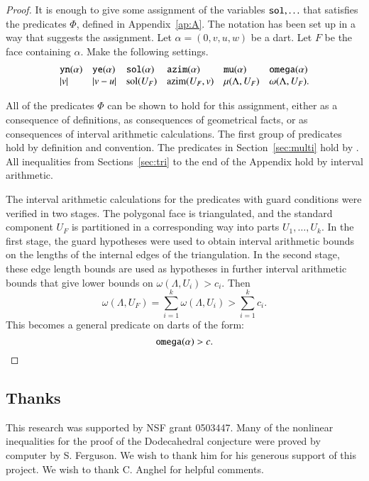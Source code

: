 \documentclass{article} %
\begin{document}
\begin{proof}  It is enough to give some assignment of the variables
${\operatorname{{\texttt{sol}}}},\ldots$ that satisfies the predicates $\Phi$, defined
in Appendix~\ref{ap:A}.  The notation has been set up in a way that
suggests the assignment.  
Let $\alpha = (0,v,u,w)$ be a dart.  Let $F$ be the face containing $\alpha$. Make the following settings.
$$
\begin{array}{llllllllllll}
{\operatorname{{\texttt{yn}}}}(\alpha) & {\operatorname{{\texttt{ye}}}}(\alpha) & {\operatorname{{\texttt{sol}}}}(\alpha) & {\operatorname{{\texttt{azim}}}}(\alpha) & {\operatorname{{\texttt{mu}}}}(\alpha) & {\operatorname{{\texttt{omega}}}}(\alpha) \\
|v|               & |v-u|           & \operatorname{sol}(U_F)   & {\operatorname{azim}}(U_F,v) & \mu(\Lambda,U_F) & \omega(\Lambda,U_F).\\
\end{array}
$$

All of the predicates $\Phi$ can be shown to hold for this assignment,
either as a consequence of definitions, as consequences of geometrical facts, or
as consequences of interval arithmetic calculations.
The first group of predicates hold by definition and convention.
%
The predicates in Section~\ref{sec:multi} hold by \cite[Lemma~5.2]{Hales:2002:Dodec}.
%
All inequalities from Sections~\ref{sec:tri} to the end of the
Appendix hold by interval arithmetic.

The interval arithmetic calculations for the predicates with guard
conditions were verified in two stages.  
The polygonal face is triangulated, and
the standard component $U_F$ is partitioned in a corresponding
way into parts $U_1,\ldots,U_k$.
In the first stage,
the guard hypotheses were used to obtain interval
arithmetic bounds on the lengths of the internal edges of the triangulation.
In the second stage, these edge length bounds are used as hypotheses
in further interval arithmetic bounds that give lower bounds on
$\omega(\Lambda,U_i) > c_i$.  Then
  $$\omega(\Lambda,U_F) = \sum_{i=1}^k\omega(\Lambda,U_i) >\sum_{i=1}^k c_i.$$
This becomes a general predicate on darts of the form:
$$
{\operatorname{{\texttt{omega}}}}(\alpha) > c.
$$
\end{proof}




\subsection*{Thanks}

This research was supported by NSF grant 0503447. Many of the
nonlinear inequalities for the proof of the Dodecahedral conjecture
were proved by computer by S. Ferguson. We wish to thank him for his
generous support of this project. We wish to thank C. Anghel for
helpful comments.
\end{document}

